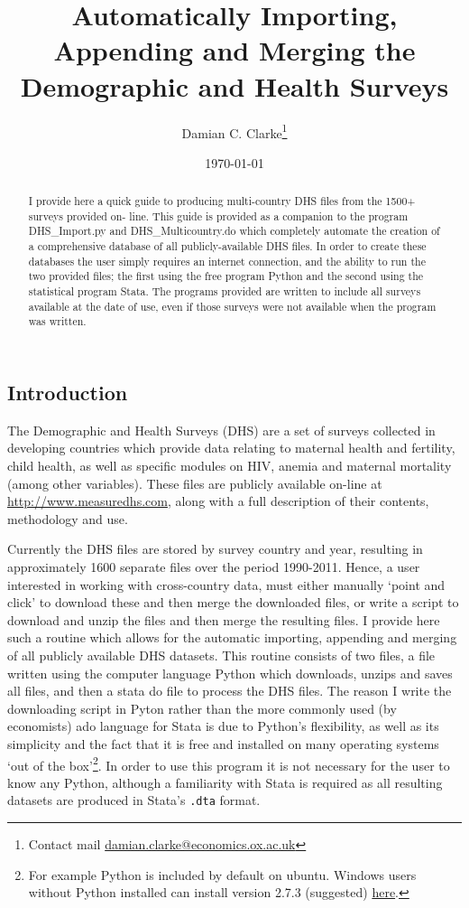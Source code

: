\documentclass{article}[11pt,subeqn]
\title{Automatically Importing, Appending and Merging the Demographic and Health Surveys}
\author{Damian C. Clarke\thanks{Contact mail \href{mailto:damian.clarke@economics.ox.ac.uk}{damian.clarke@economics.ox.ac.uk}}}
\date{\today}
\begin{document}
\begin{spacing}{1.25}

\maketitle

\begin{abstract}
I provide here a quick guide to producing multi-country DHS files from the 1500+ surveys provided on-%
line.  This guide is provided as a companion to the program DHS\_Import.py and DHS\_Multicountry.do
which completely automate the creation of a comprehensive database of all publicly-available DHS files.
In order to create these databases the user simply requires an internet connection, and the ability to
run the two provided files; the first using the free program Python and the second using the statistical
program Stata. The programs provided are written to include all surveys available at the date of use, 
even if those surveys were not available when the program was written.
\end{abstract}

\section{Introduction}
The Demographic and Health Surveys (DHS) are a set of surveys collected in developing countries which
provide data relating to maternal health and fertility, child health, as well as specific modules on
HIV, anemia and maternal mortality (among other variables).  These files are publicly available on-line
at \href{http://www.measuredhs.com/}{http://www.measuredhs.com}, along with a full description of their 
contents, methodology and use.

Currently the DHS files are stored by survey country and year, resulting in approximately 1600 separate
files over the period 1990-2011.  Hence, a user interested in working with cross-country data, must either
manually `point and click' to download these and then merge the downloaded files, or write a script to
download and unzip the files and then merge the resulting files.  I provide here such a routine which 
allows for the automatic importing, appending and merging of all publicly available DHS datasets. This
routine consists of two files, a file written using the computer language Python which downloads, unzips 
and saves all files, and then a stata do file to process the DHS files.  The reason I write the downloading 
script in Pyton rather than the more commonly used (by economists) ado language for Stata is due to 
Python's flexibility, as well as its simplicity and the fact that it is free and installed on many operating 
systems `out of the box'\footnote{For example Python is included by default on ubuntu.  Windows users 
without Python installed can install version 2.7.3 (suggested) \href{http://www.python.org/getit/}{here}.}.  
In order to use this program it is not necessary for the user to know any Python, although a familiarity 
with Stata is required as all resulting datasets are produced in Stata's \texttt{.dta} format.



\end{spacing}
\end{document}

